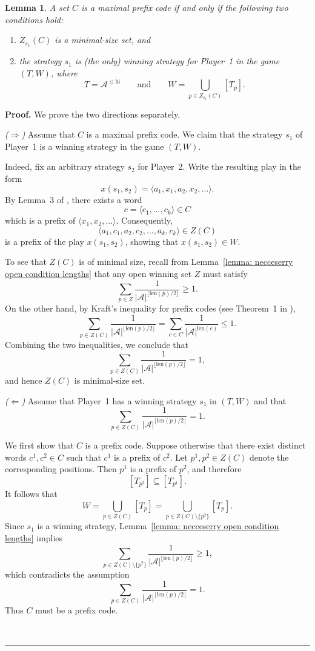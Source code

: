 \documentclass[a4,12pt]{article}%
\newtheorem{lemma}[theorem]{Lemma}
\newenvironment{proof}[1][Proof]{\textbf{#1.} }{\ \rule{0.5em}{0.5em}}
\begin{document}
\begin{lemma} \label{lemma:create winning set from max prefix code}
A set $C$ is a maximal prefix code if and only if the following two conditions hold:
\begin{enumerate}
\item $Z_{s_1}(C)$ is a minimal-size set, and
\item the strategy $s_1$
is (the only) winning strategy for Player~1 in the game $(T,W)$, where
\[
T = \mathcal{A}^{\leq \mathbb N}
\qquad \text{and} \qquad
W = \bigcup_{p \in Z_{s_1}(C)} [T_p].
\]
\end{enumerate}
\end{lemma}
\begin{proof}
We prove the two directions separately.

\medskip
\noindent
\emph{($\Rightarrow$)}  
Assume that $C$ is a maximal prefix code. We claim that the strategy $s_1$ of Player~1 is a winning strategy in the game $(T,W)$.

Indeed, fix an arbitrary strategy $s_2$ for Player~2. Write the resulting play in the form
\[
x(s_1,s_2)=\langle a_1,x_1,a_2,x_2,\dots\rangle .
\]
By Lemma~3 of \cite{maxprefixcodeiswinning}, there exists a word
\[
c=\langle c_1,\dots,c_k\rangle \in C
\]
which is a prefix of $\langle x_1,x_2,\dots\rangle$. Consequently,
\[
\langle a_1,c_1,a_2,c_2,\dots,a_k,c_k\rangle \in Z(C)
\]
is a prefix of the play $x(s_1,s_2)$, showing that $x(s_1,s_2)\in W$.

To see that $Z(C)$ is of minimal size, recall from Lemma~\ref{lemma: necceserry open condition lengths} that any open winning set $Z$ must satisfy
\[
\sum_{p\in Z} \frac{1}{|\mathcal{A}|^{\lfloor \mathrm{len}(p)/2 \rfloor}} \geq 1.
\]
On the other hand, by Kraft’s inequality for prefix codes (see Theorem~1 in \cite{maxprefixcodeiswinning}),
\[
\sum_{p\in Z(C)} \frac{1}{|\mathcal{A}|^{\lfloor \mathrm{len}(p)/2 \rfloor}}
= \sum_{c\in C} \frac{1}{|\mathcal{A}|^{\mathrm{len}(c)}} \leq 1.
\]
Combining the two inequalities, we conclude that
\[
\sum_{p\in Z(C)} \frac{1}{|\mathcal{A}|^{\lfloor \mathrm{len}(p)/2 \rfloor}} = 1,
\]
and hence $Z(C)$ is minimal-size set.

\medskip
\noindent
\emph{($\Leftarrow$)}  
Assume that Player~1 has a winning strategy $s_1$ in $(T,W)$ and that
\[
\sum_{p\in Z(C)} \frac{1}{|\mathcal{A}|^{\lfloor \mathrm{len}(p)/2 \rfloor}} = 1.
\]

We first show that $C$ is a prefix code. Suppose otherwise that there exist distinct words $c^1,c^2\in C$ such that $c^1$ is a prefix of $c^2$. Let $p^1,p^2\in Z(C)$ denote the corresponding positions. Then $p^1$ is a prefix of $p^2$, and therefore
\[
[T_{p^2}] \subseteq [T_{p^1}].
\]
It follows that
\[
W=\bigcup_{p\in Z(C)} [T_p]
   =\bigcup_{p\in Z(C)\setminus\{p^2\}} [T_p].
\]
Since $s_1$ is a winning strategy, Lemma~\ref{lemma: necceserry open condition lengths} implies
\[
\sum_{p\in Z(C)\setminus\{p^2\}}
\frac{1}{|\mathcal{A}|^{\lfloor \mathrm{len}(p)/2 \rfloor}} \geq 1,
\]
which contradicts the assumption
\[
\sum_{p\in Z(C)} \frac{1}{|\mathcal{A}|^{\lfloor \mathrm{len}(p)/2 \rfloor}} = 1.
\]
Thus $C$ must be a prefix code.


\end{proof}
\end{document}
